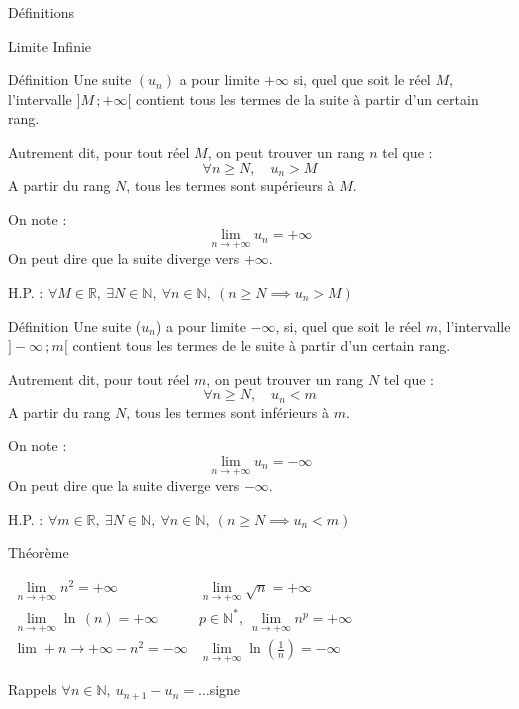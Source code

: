 \documentclass{cours}
\begin{document}
    \begin{Gpartie}{Définitions} 
        \begin{Spartie}{Limite Infinie}
            \vspace*{-2ex}
            \begin{SSpartie}{Définition} 
                Une suite $(u_n)$ a pour limite $+\infty$ si, quel que soit le réel $M$, l'intervalle $\big]M\,;+\infty\big[$ contient tous les termes de la suite à partir d'un certain rang.

                Autrement dit, pour tout réel $M$, on peut trouver un rang $n$ tel que : \[\forall n\geq N,\quad u_n>M\]
                A partir du rang $N$, tous les termes sont supérieurs à $M$.

                On note : \[\boxed{\lim\limits_{n\to +\infty} u_n=+\infty}\] On peut dire que la suite diverge vers $+\infty$.

                H.P. : $\forall M\in\mathbb{R},~\exists N\in\mathbb{N},~\forall n\in\mathbb{N},~(n\geq N\implies u_n>M)$
            \end{SSpartie}
            \begin{SSpartie}{Définition} 
                Une suite ($u_n$) a pour limite $-\infty$, si, quel que soit le réel $m$, l'intervalle $\big]-\infty\,;m\big[$ contient tous les termes de le suite à partir d'un certain rang.

                Autrement dit, pour tout réel $m$, on peut trouver un rang $N$ tel que : \[\forall n\geq N,\quad u_n<m\]
                A partir du rang $N$, tous les termes sont inférieurs à $m$.

                On note : \[\boxed{\lim\limits_{n\to +\infty} u_n=-\infty}\] On peut dire que la suite diverge vers $-\infty$.

                H.P. : $\forall m\in\mathbb{R},~\exists N\in\mathbb{N},~\forall n\in\mathbb{N},~(n\geq N\implies u_n<m)$
            \end{SSpartie}
            \begin{SSpartie}{Théorème}
                \begin{center}$\begin{array}{cc}
                    \lim\limits_{n\to +\infty} n^2=+\infty & \lim\limits_{n\to +\infty} \sqrt{n}=+\infty \\
    
                    \lim\limits_{n\to +\infty} \ln\,(n)=+\infty & p\in\mathbb{N^*},\ \lim\limits_{n\to +\infty} n^p=+\infty \\
                    \lim\limits+{n\to +\infty} -n^2=-\infty & \lim\limits_{n\to +\infty} \ln\left(\frac{1}{n}\right)=-\infty
                \end{array}$\end{center}
            \end{SSpartie}
            \begin{SSpartie}{Rappels} 
                $\forall n\in\mathbb{N},\ u_{n+1}-u_n=\dotsc$\quad signe


\end{SSpartie}
\end{Spartie}
\end{Gpartie}
\end{document}
